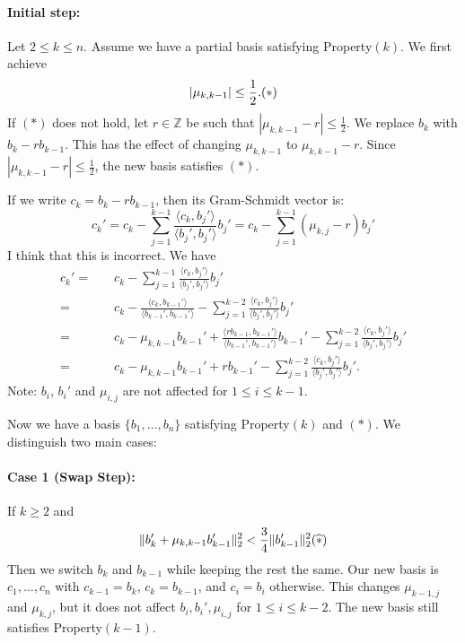 \documentclass{Vorlesungstemplate_English} %
\begin{document}
\paragraph{Initial step:} Let $2 \le k \le n$. Assume we have a partial basis satisfying Property$(k)$. We first achieve
\[ |\mu_{k,k-1}| \le \frac{1}{2}. \hfill (*) \]
If $(*)$ does not hold, let $r \in \mathbb{Z}$ be such that $|\mu_{k,k-1} - r| \le \frac{1}{2}$. We replace $b_k$ with $b_k - rb_{k-1}$. This has the effect of changing $\mu_{k,k-1}$ to $\mu_{k,k-1} - r$. Since $|\mu_{k,k-1} - r| \le \frac{1}{2}$, the new basis satisfies $(*)$.

\begin{addcalc}
If we write $c_k = b_k - rb_{k-1}$, then its Gram-Schmidt vector is:
\[ c_k' = c_k - \sum_{j=1}^{k-1} \frac{\langle c_k, b_j' \rangle}{\langle b_j', b_j' \rangle} b_j' = c_k - \sum_{j=1}^{k-1} (\mu_{k,j} - r) b_j' \]
{\color{blue} I think that this is incorrect. We have
\begin{align*}
  c_k' = \quad & c_k - \sum_{j=1}^{k-1}\frac{\langle c_k, b_j' \rangle}{\langle b_j', b_j' \rangle} b_j' \\
  = \quad & c_k - \frac{\langle c_k, b_{k-1}'\rangle}{\langle b_{k-1}', b_{k-1}'\rangle} - \sum_{j=1}^{k-2} \frac{\langle c_k, b_j' \rangle}{\langle b_j', b_j' \rangle} b_j' \\
  = \quad & c_k - \mu_{k,k-1}b_{k-1}'+\frac{\langle rb_{k-1}, b_{k-1}'\rangle}{\langle b_{k-1}', b_{k-1}'\rangle}b_{k-1}' - \sum_{j=1}^{k-2} \frac{\langle c_k, b_j' \rangle}{\langle b_j', b_j' \rangle} b_j' \\
  = \quad & c_k - \mu_{k,k-1}b_{k-1}' + rb_{k-1}' - \sum_{j=1}^{k-2} \frac{\langle c_k, b_j' \rangle}{\langle b_j', b_j' \rangle} b_j'.
\end{align*}}
Note: $b_i$, $b_i'$ and $\mu_{i,j}$ are not affected for $1 \le i \le k-1$.
\end{addcalc}

\noindent Now we have a basis $\{ b_1, \dots, b_n \}$ satisfying Property$(k)$ and $(*)$. We distinguish two main cases:

\paragraph{Case 1 (Swap Step):} If $k \ge 2$ and
\[ \|b_k' + \mu_{k,k-1}b_{k-1}'\|_2^2 < \frac{3}{4} \|b_{k-1}'\|_2^2 \hfill (\widehat{*}) \]
Then we switch $b_k$ and $b_{k-1}$ while keeping the rest the same. Our new basis is $c_1, \dots, c_n$ with $c_{k-1} = b_k$, $c_k = b_{k-1}$, and $c_i = b_i$ otherwise.
This changes $\mu_{k-1,j}$ and $\mu_{k,j}$, but it does not affect $b_i, b_i', \mu_{i,j}$ for $1 \le i \le k-2$. The new basis still satisfies Property$(k-1)$.
\end{document}
